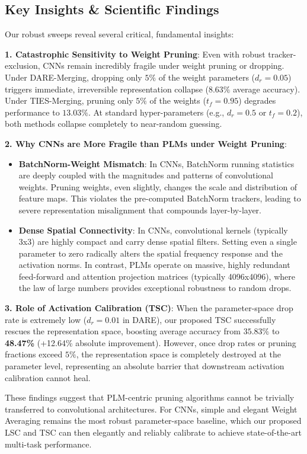 \documentclass{article}
\theoremstyle{plain}
\theoremstyle{definition}
\theoremstyle{remark}
\begin{document}
\subsection{Key Insights \& Scientific Findings}
Our robust sweeps reveal several critical, fundamental insights:

\textbf{1. Catastrophic Sensitivity to Weight Pruning}: Even with robust tracker-exclusion, CNNs remain incredibly fragile under weight pruning or dropping. Under DARE-Merging, dropping only $5\%$ of the weight parameters ($d_r = 0.05$) triggers immediate, irreversible representation collapse ($8.63\%$ average accuracy). Under TIES-Merging, pruning only $5\%$ of the weights ($t_f = 0.95$) degrades performance to $13.03\%$. At standard hyper-parameters (e.g., $d_r = 0.5$ or $t_f = 0.2$), both methods collapse completely to near-random guessing.

\textbf{2. Why CNNs are More Fragile than PLMs under Weight Pruning}:
\begin{itemize}
    \item \textbf{BatchNorm-Weight Mismatch}: In CNNs, BatchNorm running statistics are deeply coupled with the magnitudes and patterns of convolutional weights. Pruning weights, even slightly, changes the scale and distribution of feature maps. This violates the pre-computed BatchNorm trackers, leading to severe representation misalignment that compounds layer-by-layer.
    \item \textbf{Dense Spatial Connectivity}: In CNNs, convolutional kernels (typically 3x3) are highly compact and carry dense spatial filters. Setting even a single parameter to zero radically alters the spatial frequency response and the activation norms. In contrast, PLMs operate on massive, highly redundant feed-forward and attention projection matrices (typically 4096x4096), where the law of large numbers provides exceptional robustness to random drops.
\end{itemize}

\textbf{3. Role of Activation Calibration (TSC)}:
When the parameter-space drop rate is extremely low ($d_r = 0.01$ in DARE), our proposed TSC successfully rescues the representation space, boosting average accuracy from $35.83\%$ to \textbf{48.47\%} (+12.64\% absolute improvement). However, once drop rates or pruning fractions exceed $5\%$, the representation space is completely destroyed at the parameter level, representing an absolute barrier that downstream activation calibration cannot heal.

These findings suggest that PLM-centric pruning algorithms cannot be trivially transferred to convolutional architectures. For CNNs, simple and elegant Weight Averaging remains the most robust parameter-space baseline, which our proposed LSC and TSC can then elegantly and reliably calibrate to achieve state-of-the-art multi-task performance.
\end{document}
